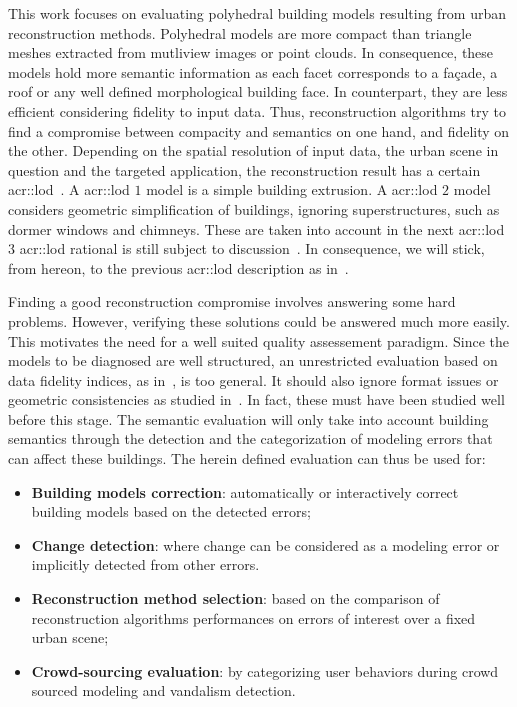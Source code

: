 \documentclass[runningheads]{llncs}
\begin{document}
    This work focuses on evaluating polyhedral building models resulting from urban reconstruction methods. Polyhedral models are more compact than triangle meshes extracted from mutliview images or point clouds. In consequence, these models hold more semantic information as each facet corresponds to a fa\c{c}ade, a roof or any well defined morphological building face. In counterpart, they are less efficient considering fidelity to input data. Thus, reconstruction algorithms try to find a compromise between compacity and semantics on one hand, and fidelity on the other. Depending on the spatial resolution of input data, the urban scene in question and the targeted application, the reconstruction result has a certain \acrfull{acr::lod}~\cite{kolbe2005citygml}. A \acrshort{acr::lod} $1$ model is a simple building extrusion. A \acrshort{acr::lod} $2$ model considers geometric simplification of buildings, ignoring superstructures, such as dormer windows and chimneys. These are taken into account in the next \acrshort{acr::lod} $3$ \acrshort{acr::lod} rational is still subject to discussion~\cite{2016_ceus_improved_lod}. In consequence, we will stick, from hereon, to the previous \acrshort{acr::lod} description as in~\cite{verdie2015lod}.

     Finding a good reconstruction compromise involves answering some hard problems. However, verifying these solutions could be answered much more easily. This motivates the need for a well suited quality assessement paradigm. Since the models to be diagnosed are well structured, an unrestricted evaluation based on data fidelity indices, as in~\cite{berger2013benchmark}, is too general. It should also ignore format issues or geometric consistencies as studied in~\cite{ledoux2018val3dity}. In fact, these must have been studied well before this stage. The semantic evaluation will only take into account building semantics through the detection and the categorization of modeling errors that can affect these buildings. The herein defined evaluation can thus be used for:
    \begin{itemize}
        \item \textbf{Building models correction}: automatically or interactively correct building models based on the detected errors;
        \item \textbf{Change detection}: where change can be considered as a modeling error or implicitly detected from other errors.
        \item \textbf{Reconstruction method selection}: based on the comparison of reconstruction algorithms performances on errors of interest over a fixed urban scene;
        \item \textbf{Crowd-sourcing evaluation}: by categorizing user behaviors during crowd sourced modeling and vandalism detection.
    \end{itemize}
\end{document}
